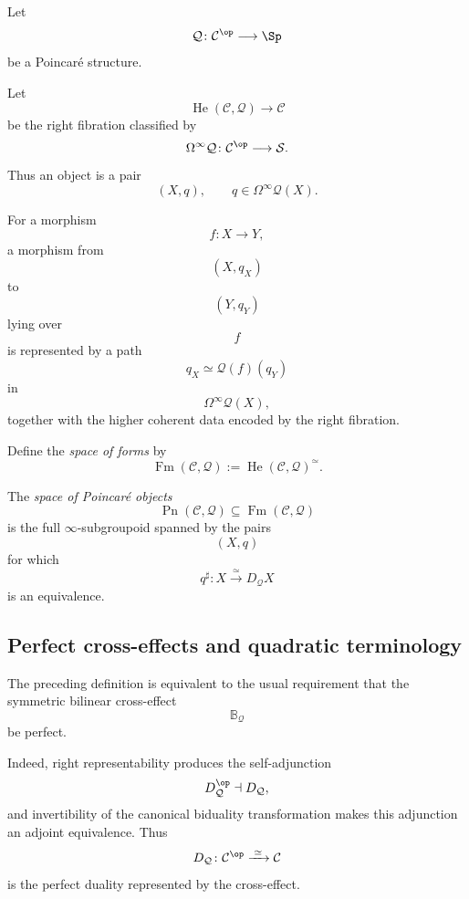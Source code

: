 \begin{definition}
\label{def:spaces-of-poincare-objects}
Let
\[
    \mathcal Q
    \colon
    \mathcal C^{\op}
    \longrightarrow
    \Sp
\]
be a Poincar\'e structure.

Let
\[
    \operatorname{He}(\mathcal C,\mathcal Q)
    \longrightarrow
    \mathcal C
\]
be the right fibration classified by
\[
    \Omega^\infty\mathcal Q
    \colon
    \mathcal C^{\op}
    \longrightarrow
    \mathcal S.
\]
Thus an object is a pair
\[
    (X,q),
    \qquad
    q\in\Omega^\infty\mathcal Q(X).
\]

For a morphism
\[
    f
    \colon
    X
    \longrightarrow
    Y,
\]
a morphism from
\[
    (X,q_X)
\]
to
\[
    (Y,q_Y)
\]
lying over
\[
    f
\]
is represented by a path
\[
    q_X
    \simeq
    \mathcal Q(f)(q_Y)
\]
in
\[
    \Omega^\infty\mathcal Q(X),
\]
together with the higher coherent data encoded by the right fibration.

Define the \emph{space of forms} by
\[
    \operatorname{Fm}(\mathcal C,\mathcal Q)
    :=
    \operatorname{He}(\mathcal C,\mathcal Q)^\simeq.
\]

The \emph{space of Poincar\'e objects}
\[
    \operatorname{Pn}(\mathcal C,\mathcal Q)
    \subseteq
    \operatorname{Fm}(\mathcal C,\mathcal Q)
\]
is the full $\infty$-subgroupoid spanned by the pairs
\[
    (X,q)
\]
for which
\[
    q^\sharp
    \colon
    X
    \xrightarrow{\;\simeq\;}
    D_{\mathcal Q}X
\]
is an equivalence.
\end{definition}


\subsection{Perfect cross-effects and quadratic terminology}

\begin{remark}
\label{rem:poincare-perfect-bilinear-cross-effect}
The preceding definition is equivalent to the usual requirement that the
symmetric bilinear cross-effect
\[
    \mathbb B_{\mathcal Q}
\]
be perfect.

Indeed, right representability produces the self-adjunction
\[
    D_{\mathcal Q}^{\op}
    \dashv
    D_{\mathcal Q},
\]
and invertibility of the canonical biduality transformation makes this
adjunction an adjoint equivalence. Thus
\[
    D_{\mathcal Q}
    \colon
    \mathcal C^{\op}
    \xrightarrow{\;\simeq\;}
    \mathcal C
\]
is the perfect duality represented by the cross-effect.
\end{remark}

